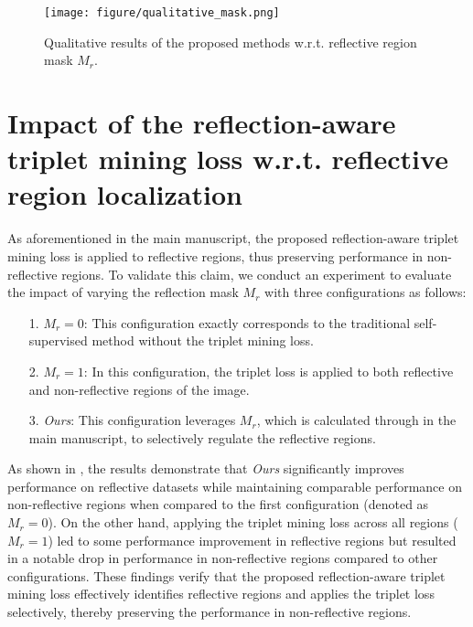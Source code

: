 \begin{figure}[ht]
\texttt{[image: figure/qualitative\_mask.png]}
\caption{Qualitative results of the proposed methods w.r.t. reflective region mask $M_r$.}
\label{fig:qualitative_mask}
\end{figure}

\section{Impact of the reflection-aware triplet mining loss w.r.t. reflective region localization}
\label{sec:impact_of_triplet_minig_loss}

As aforementioned in the main manuscript, the proposed reflection-aware triplet mining loss is applied to reflective regions, thus preserving performance in non-reflective regions.
To validate this claim, we conduct an experiment to evaluate the impact of varying the reflection mask $M_r$ with three configurations as follows:

\begin{itemize}
    \item[1.] $M_r = 0$: This configuration exactly corresponds to the traditional self-supervised method without the triplet mining loss.
    \item[2.] $M_r = 1$: In this configuration, the triplet loss is applied to both reflective and non-reflective regions of the image.
    \item[3.] \textit{Ours}: This configuration leverages $M_r$, which is calculated through  in the main manuscript, to selectively regulate the reflective regions.
\end{itemize}

As shown in , the results demonstrate that \textit{Ours} significantly improves performance on reflective datasets while maintaining comparable performance on non-reflective regions when compared to the first configuration (denoted as $M_r = 0$).
On the other hand, applying the triplet mining loss across all regions ($M_r = 1$) led to some performance improvement in reflective regions but resulted in a notable drop in performance in non-reflective regions compared to other configurations.
These findings verify that the proposed reflection-aware triplet mining loss effectively identifies reflective regions and applies the triplet loss selectively, thereby preserving the performance in non-reflective regions.


